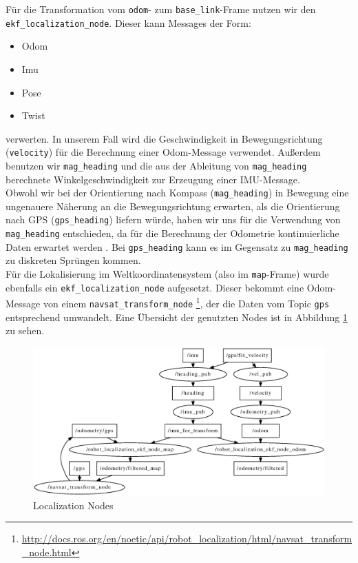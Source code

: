 \documentclass[11pt]{article}
\begin{document}
Für die Transformation vom \texttt{odom}- zum \texttt{base\_link}-Frame nutzen wir den \texttt{ekf\_localization\_node}. Dieser kann Messages der Form:
\begin{itemize}
	\item Odom
	\item Imu
	\item Pose
	\item Twist
\end{itemize}
verwerten.
In unserem Fall wird die Geschwindigkeit in Bewegungsrichtung (\texttt{velocity}) für die Berechnung einer Odom-Message verwendet.
Außerdem benutzen wir \texttt{mag\_heading} und die aus der Ableitung von \texttt{mag\_heading} berechnete Winkelgeschwindigkeit zur Erzeugung einer IMU-Message.\\
Obwohl wir bei der Orientierung nach Kompass (\texttt{mag\_heading}) in Bewegung eine ungenauere Näherung an die Bewegungsrichtung erwarten, als die Orientierung nach GPS (\texttt{gps\_heading}) liefern würde, haben wir uns für die Verwendung von \texttt{mag\_heading} entschieden, da für die Berechnung der Odometrie kontinuierliche Daten erwartet werden \cite{REP105}. Bei \texttt{gps\_heading} kann es im Gegensatz zu \texttt{mag\_heading} zu diskreten Sprüngen kommen.\\

Für die Lokalisierung im Weltkoordinatensystem (also im \texttt{map}-Frame) wurde ebenfalls ein \texttt{ekf\_localization\_node} aufgesetzt. Dieser bekommt eine Odom-Message von einem \texttt{navsat\_transform\_node} \footnote{\url{http://docs.ros.org/en/noetic/api/robot_localization/html/navsat_transform_node.html}}, der die Daten vom Topic \texttt{gps} entsprechend umwandelt. Eine Übersicht der genutzten Nodes ist in Abbildung \ref{localization-overview} zu sehen.

\begin{figure}[h]
	\includegraphics[width=\linewidth]{localization-nodes}
	\caption{Localization Nodes}
	\label{localization-overview}
\end{figure}
\end{document}
